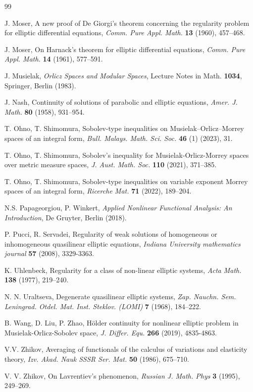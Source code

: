 \documentclass[10pt,reqno]{amsart}
\newcommand *\w{^\wedge}
\theoremstyle{definition}
\numberwithin{equation}{section}
\begin{document}
\begin{thebibliography}{99}
{ 
J. Moser,  
A new proof of De Giorgi's theorem concerning the regularity problem for elliptic differential equations,  
{\it Comm. Pure Appl. Math.} \textbf{13} (1960), 457--468.

J. Moser,  
On Harnack's theorem for elliptic differential equations,  
{\it Comm. Pure Appl. Math.} \textbf{14} (1961), 577--591.

J. Musielak, 
{\it Orlicz Spaces and Modular Spaces}, 
Lecture Notes in Math. \textbf{1034}, Springer, Berlin (1983).

J. Nash,  
Continuity of solutions of parabolic and elliptic equations,  
{\it Amer. J. Math.} \textbf{80} (1958), 931--954.

T. Ohno, T. Shimomura, 
Sobolev-type inequalities on Musielak–Orlicz–Morrey spaces of an integral form, 
{\it Bull. Malays. Math. Sci. Soc.} \textbf{46} (1) (2023), 31.

T. Ohno, T. Shimomura, 
Sobolev's inequality for Musielak-Orlicz-Morrey spaces over metric measure spaces, 
{\it J. Aust. Math. Soc.} \textbf{110} (2021), 371–385.

T. Ohno, T. Shimomura, 
Sobolev-type inequalities on variable exponent Morrey spaces of an integral form, 
{\it Ricerche Mat.} \textbf{71} (2022), 189–204.

N.S. Papageorgiou, P. Winkert, 
{\it Applied Nonlinear Functional Analysis: An Introduction}, 
De Gruyter, Berlin (2018).

 P. Pucci, R. Servadei, Regularity of weak solutions of homogeneous or inhomogeneous quasilinear elliptic equations, \textit{Indiana University mathematics journal} \textbf{57} (2008), 3329-3363.

K. Uhlenbeck,  
Regularity for a class of non-linear elliptic systems,  
{\it Acta Math.} \textbf{138} (1977), 219--240.

N. N. Uraltseva,  
Degenerate quasilinear elliptic systems,  
{\it Zap. Nauchn. Sem. Leningrad. Otdel. Mat. Inst. Steklov. (LOMI)} \textbf{7} (1968), 184--222.

B. Wang, D. Liu, P. Zhao,
H\"older continuity for nonlinear elliptic problem in Musielak-Orlicz-Sobolev space,
{\it  J. Differ. Equ.} \textbf{266} (2019), 4835-4863.

V.V. Zhikov, Averaging of functionals of the calculus of variations and elasticity theory, \textit{Izv. Akad. Nauk
SSSR Ser. Mat.} \textbf{50} (1986), 675--710.

V. V. Zhikov,
On Lavrentiev's phenomenon,
\textit{Russian J. Math. Phys} \textbf{3} (1995), 249--269.

}
\end{thebibliography}
\end{document}

